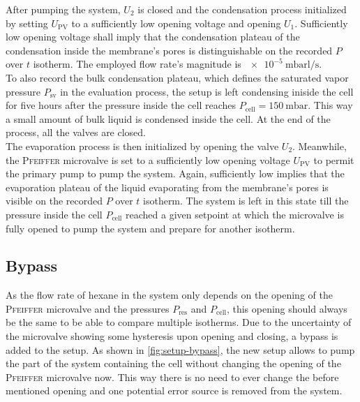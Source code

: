 \documentclass[../thesis.tex]{subfiles}
\begin{document}
                After pumping the system, $U_2$ is closed and the condensation process initialized by setting $U_\mathrm{PV}$ to a sufficiently low opening voltage and opening $U_1$. Sufficiently low opening voltage shall imply that the condensation plateau of the condensation inside the membrane's pores is distinguishable on the recorded $P$ over $t$ isotherm. The employed flow rate's magnitude is  $\SI{e-5}{\milli\bar\litre\per\second}$.\\

                To also record the bulk condensation plateau, which defines the saturated vapor pressure $P_\mathrm{sv}$ in the evaluation process, the setup is left condensing iniside the cell for five hours after the pressure inside the cell reaches $P_\mathrm{cell} = \SI{150}{\milli\bar}$. This way a small amount of bulk liquid is condensed inside the cell. At the end of the process, all the valves are closed. \\

                The evaporation process is then initialized by opening the valve $U_2$. Meanwhile, the \textsc{Pfeiffer} microvalve is set to a sufficiently low opening voltage $U_\mathrm{PV}$ to permit the primary pump to pump the system. Again, sufficiently low implies that the evaporation plateau of the  liquid evaporating from the membrane's pores is visible on the recorded $P$ over $t$ isotherm. The system is left in this state till the pressure inside the cell $P_\mathrm{cell}$ reached a given setpoint at which the microvalve is fully opened to pump the system and prepare for another isotherm.


            \subsection{Bypass}
            \label{subsec:bypass}

                As the flow rate of hexane in the system only depends on the opening of the \textsc{Pfeiffer} microvalve and the pressures $P_\mathrm{res}$ and $P_\mathrm{cell}$, this opening should always be the same to be able to compare multiple isotherms. Due to the uncertainty of the microvalve showing some hysteresis upon opening and closing, a bypass is added to the setup. As shown in \cref{fig:setup-bypass}, the new setup allows to pump the part of the system containing the cell without changing the opening of the \textsc{Pfeiffer} microvalve now. This way there is no need to ever change the before mentioned opening and one potential error source is removed from the system.
                \medskip
\end{document}
